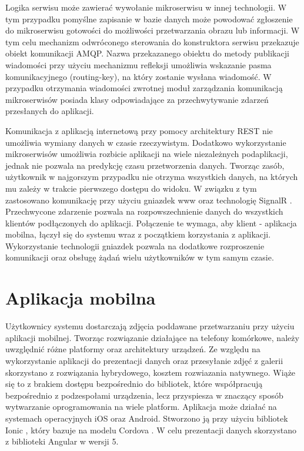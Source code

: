 {Logika serwisu może zawierać wywołanie mikroserwisu w innej technologii. W tym przypadku pomyślne zapisanie w bazie danych może powodować zgłoszenie do mikroserwisu gotowości do możliwości przetwarzania obrazu lub informacji. W tym celu mechanizm odwróconego sterowania do konstruktora serwisu przekazuje obiekt komunikacji AMQP. Nazwa przekazanego obiektu do metody publikacji wiadomości przy użyciu mechanizmu refleksji umożliwia wskazanie pasma komunikacyjnego (routing-key), na który zostanie wysłana wiadomość. W przypadku otrzymania wiadomości zwrotnej moduł zarządzania komunikacją mikroserwisów posiada klasy odpowiadające za przechwytywanie zdarzeń przesłanych do aplikacji. 

Komunikacja z aplikacją internetową przy pomocy architektury REST nie umożliwia wymiany danych w czasie rzeczywistym. Dodatkowo wykorzystanie mikroserwisów umożliwia rozbicie aplikacji na wiele niezależnych podaplikacji, jednak nie pozwala na predykcję czasu przetworzenia danych. Tworząc zasób, użytkownik w najgorszym przypadku nie otrzyma wszystkich danych, na których mu zależy w trakcie pierwszego dostępu do widoku. W związku z tym zastosowano komunikację przy użyciu gniazdek www oraz technologię SignalR \cite{SignalR}. Przechwycone zdarzenie pozwala na rozpowszechnienie danych do wszystkich klientów podłączonych do aplikacji. Połączenie te wymaga, aby klient - aplikacja mobilna, łączył się do systemu wraz z początkiem korzystania z aplikacji. Wykorzystanie technologii gniazdek pozwala na dodatkowe rozproszenie komunikacji oraz obsługę żądań wielu użytkowników w tym samym czasie.

\section{Aplikacja mobilna}
{ Użytkownicy systemu dostarczają zdjęcia poddawane przetwarzaniu przy użyciu aplikacji mobilnej. Tworząc rozwiązanie działające na telefony komórkowe, należy uwzględnić różne platformy oraz architektury urządzeń. Ze względu na wykorzystanie aplikacji do prezentacji danych oraz przesyłanie zdjęć z galerii skorzystano z rozwiązania hybrydowego, kosztem rozwiazania natywnego. Wiąże się to z brakiem dostępu bezpośrednio do bibliotek, które współpracują bezpośrednio z podzespołami urządzenia, lecz przyspiesza w znaczący sposób wytwarzanie oprogramowania na wiele platform. Aplikacja może działać na systemach operacyjnych iOS oraz Android. Stworzono ją przy użyciu bibliotek Ionic \cite{Ionic}, który bazuje na modelu Cordova \cite{Cordova}. W celu prezentacji danych skorzystano z biblioteki Angular\cite{Angular} w wersji 5. 
	
}}
